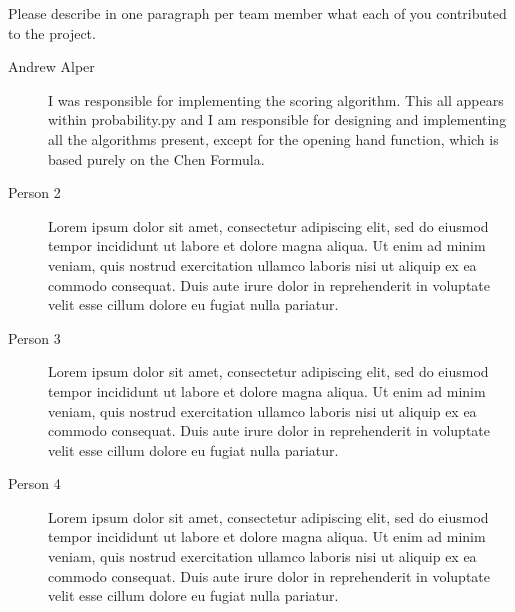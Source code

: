 \documentclass[10pt,twocolumn,letterpaper]{article}
\begin{document}
Please describe in one paragraph per team member what each of you contributed to the project.
\begin{description}
\item[Andrew Alper] I was responsible for implementing the scoring algorithm. This all appears within probability.py and I am responsible for designing and implementing all the algorithms present, except for the opening hand function, which is based purely on the Chen Formula.  
\item[Person 2] Lorem ipsum dolor sit amet, consectetur adipiscing elit, sed do eiusmod tempor incididunt ut labore et dolore magna aliqua. Ut enim ad minim veniam, quis nostrud exercitation ullamco laboris nisi ut aliquip ex ea commodo consequat. Duis aute irure dolor in reprehenderit in voluptate velit esse cillum dolore eu fugiat nulla pariatur.
\item [Person 3] Lorem ipsum dolor sit amet, consectetur adipiscing elit, sed do eiusmod tempor incididunt ut labore et dolore magna aliqua. Ut enim ad minim veniam, quis nostrud exercitation ullamco laboris nisi ut aliquip ex ea commodo consequat. Duis aute irure dolor in reprehenderit in voluptate velit esse cillum dolore eu fugiat nulla pariatur. 
\item [Person 4] Lorem ipsum dolor sit amet, consectetur adipiscing elit, sed do eiusmod tempor incididunt ut labore et dolore magna aliqua. Ut enim ad minim veniam, quis nostrud exercitation ullamco laboris nisi ut aliquip ex ea commodo consequat. Duis aute irure dolor in reprehenderit in voluptate velit esse cillum dolore eu fugiat nulla pariatur.
\end{description}
\end{document}
